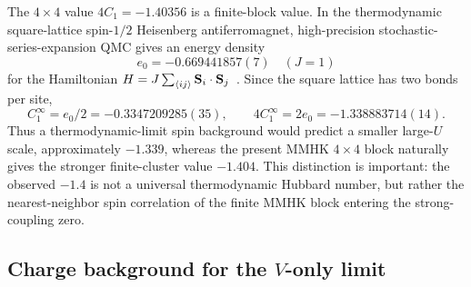 \documentclass[11pt]{article}
\newcommand{\Cnn}{C_1}
\begin{document}
The $4\times4$ value $4\Cnn=-1.40356$ is a finite-block value.  In the thermodynamic
square-lattice spin-$1/2$ Heisenberg antiferromagnet, high-precision stochastic-series-expansion
QMC gives an energy density
\begin{equation}
  e_0=-0.669441857(7) \quad (J=1)
\end{equation}
for the Hamiltonian $H=J\sum_{\langle ij\rangle}{\bf S}_i\cdot{\bf S}_j$~\cite{sandvik2026highprecision}.
Since the square lattice has two bonds per site,
\begin{equation}
  \Cnn^{\infty}=e_0/2=-0.3347209285(35),
  \qquad
  4\Cnn^{\infty}=2e_0=-1.338883714(14).
\end{equation}
Thus a thermodynamic-limit spin background would predict a smaller large-$U$ scale,
approximately $-1.339$, whereas the present MMHK $4\times4$ block naturally gives the stronger
finite-cluster value $-1.404$.  This distinction is important: the observed $-1.4$ is not a
universal thermodynamic Hubbard number, but rather the nearest-neighbor spin correlation of the
finite MMHK block entering the strong-coupling zero.

\subsection{Charge background for the $V$-only limit}
\end{document}
